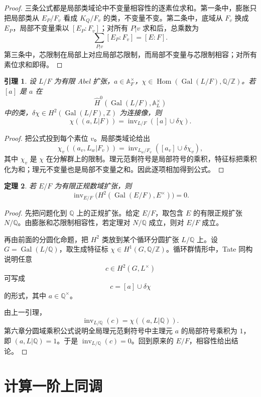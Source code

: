 \documentclass[11pt,a4paper,openany]{ctexbook}
\numberwithin{equation}{chapter}
\newcommand{\Q}{\mathbb{Q}}
\newcommand{\Z}{\mathbb{Z}}
\newcommand{\A}{\mathbb{A}}
\newcommand{\Gal}{\operatorname{Gal}}
\theoremstyle{plain}
\newtheorem{theorem}{定理}[chapter]
\newtheorem{lemma}[theorem]{引理}
\theoremstyle{definition}
\theoremstyle{remark}
\begin{document}
\begin{proof}
三条公式都是局部类域论中不变量相容性的逐素位求和。第一条中，膨胀只把局部类从 $E_P/F_v$ 看成 $K_Q/F_v$ 的类，不变量不变。第二条中，底域从 $F_v$ 换成 $E_P$，局部不变量乘以 $[E_P:F_v]$；对所有 $P|v$ 求和后，总乘数为
\[
\sum_{P|v}[E_P:F_v]=[E:F].
\]
第三条中，芯限制在局部上对应局部芯限制，而局部不变量与芯限制相容；对所有素位求和即得。
\end{proof}

\begin{lemma}
设 $L/F$ 为有限 Abel 扩张，$a\in\A_F^\times$，$\chi\in\operatorname{Hom}(\Gal(L/F),\Q/\Z)$。若 $[a]$ 是 $a$ 在
\[
\widehat H^0(\Gal(L/F),\A_L^\times)
\]
中的类，$\delta\chi\in H^2(\Gal(L/F),\Z)$ 为连接像，则
\[
\chi((a,L|F))=\operatorname{inv}_{L/F}([a]\cup\delta\chi).
\]
\end{lemma}

\begin{proof}
把公式投到每个素位 $v$。局部类域论给出
\[
\chi_v((a_v,L_w|F_v))
=\operatorname{inv}_{L_w/F_v}([a_v]\cup\delta\chi_v),
\]
其中 $\chi_v$ 是 $\chi$ 在分解群上的限制。理元范剩符号是局部符号的乘积，特征标把乘积化为和；理元不变量也是局部不变量之和。因此逐项相加得到公式。
\end{proof}

\begin{theorem}
若 $E/F$ 为有限正规数域扩张，则
\[
\operatorname{inv}_{E/F}\bigl(H^2(\Gal(E/F),E^\times)\bigr)=0.
\]
\end{theorem}

\begin{proof}
先把问题化到 $\Q$ 上的正规扩张。给定 $E/F$，取包含 $E$ 的有限正规扩张 $N/\Q$。由膨胀和芯限制相容性，若定理对 $N/\Q$ 成立，则对 $E/F$ 成立。

再由前面的分圆化命题，把 $H^2$ 类放到某个循环分圆扩张 $L/\Q$ 上。设 $G=\Gal(L/\Q)$，取生成特征标 $\chi\in H^1(G,\Q/\Z)$。循环群情形中，Tate 同构说明任意
\[
c\in H^2(G,L^\times)
\]
可写成
\[
c=[a]\cup\delta\chi
\]
的形式，其中 $a\in\Q^\times$。

由上一引理，
\[
\operatorname{inv}_{L/\Q}(c)=\chi((a,L|\Q)).
\]
第六章分圆域乘积公式说明全局理元范剩符号中主理元 $a$ 的局部符号乘积为 $1$，即 $(a,L|\Q)=1$。于是 $\operatorname{inv}_{L/\Q}(c)=0$。回到原来的 $E/F$，相容性给出结论。
\end{proof}

\section{计算一阶上同调}
\end{document}
